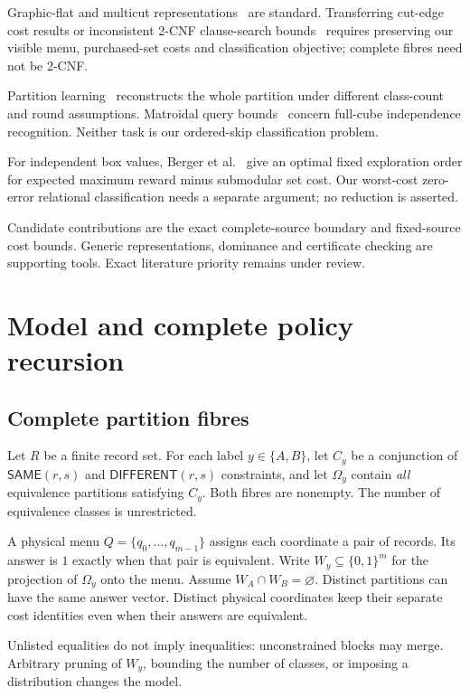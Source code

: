 \documentclass[pdflatex,sn-mathphys-num]{sn-jnl}
\newcommand{\SAME}{\mathsf{SAME}}
\newcommand{\DIFF}{\mathsf{DIFFERENT}}
\theoremstyle{thmstyleone}
\theoremstyle{thmstylethree}
\theoremstyle{thmstyletwo}
\begin{document}
Graphic-flat and multicut representations~\cite{berczi,hornakova} are standard. Transferring cut-edge cost results or inconsistent 2-CNF clause-search bounds~\cite{lovasz} requires preserving our visible menu, purchased-set costs and classification objective; complete fibres need not be 2-CNF.

Partition learning~\cite{liu,black} reconstructs the whole partition under different class-count and round assumptions. Matroidal query bounds~\cite{kulkarni} concern full-cube independence recognition. Neither task is our ordered-skip classification problem.

For independent box values, Berger et al.~\cite{pandora} give an optimal fixed exploration order for expected maximum reward minus submodular set cost. Our worst-cost zero-error relational classification needs a separate argument; no reduction is asserted.

Candidate contributions are the exact complete-source boundary and fixed-source cost bounds. Generic representations, dominance and certificate checking are supporting tools. Exact literature priority remains under review.


\section{Model and complete policy recursion}
\subsection{Complete partition fibres}
Let $R$ be a finite record set. For each label $y\in\{A,B\}$, let $C_y$ be a conjunction of $\SAME(r,s)$ and $\DIFF(r,s)$ constraints, and let $\Omega_y$ contain \emph{all} equivalence partitions satisfying $C_y$. Both fibres are nonempty. The number of equivalence classes is unrestricted.

A physical menu $Q=\{q_0,\ldots,q_{m-1}\}$ assigns each coordinate a pair of records. Its answer is $1$ exactly when that pair is equivalent. Write $W_y\subseteq\{0,1\}^m$ for the projection of $\Omega_y$ onto the menu. Assume $W_A\cap W_B=\varnothing$. Distinct partitions can have the same answer vector. Distinct physical coordinates keep their separate cost identities even when their answers are equivalent.

Unlisted equalities do not imply inequalities: unconstrained blocks may merge. Arbitrary pruning of $W_y$, bounding the number of classes, or imposing a distribution changes the model.
\end{document}
